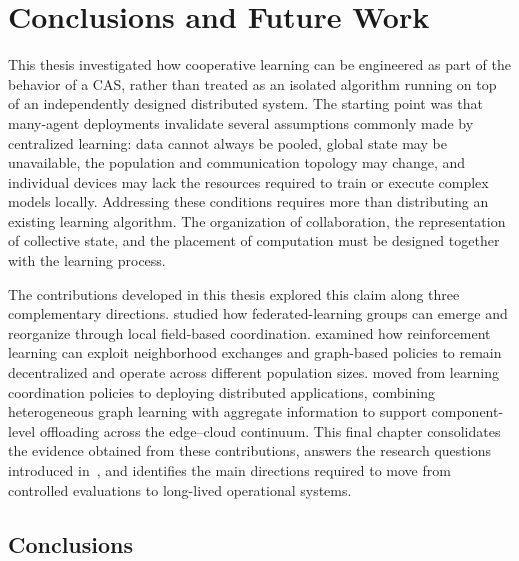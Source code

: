 
\chapter{Conclusions and Future Work}
\label{chap:wrapup}
\minitoc

This thesis investigated how cooperative learning 
 can be engineered as part of the behavior of a \gls{CAS}, 
 rather than treated as an isolated algorithm running
 on top of an independently designed distributed system.
%
The starting point was that many-agent deployments invalidate several assumptions 
 commonly made by centralized learning: data cannot always be pooled,
 global state may be unavailable, the population and communication topology may change, 
 and individual devices may lack the resources required to train or execute complex models locally.
%
Addressing these conditions requires more than distributing an existing learning algorithm. 
%
The organization of collaboration, the representation of collective state, 
 and the placement of computation must be designed together with the learning process.

The contributions developed in this thesis explored 
 this claim along three complementary directions.
%
 studied how federated-learning groups can emerge 
 and reorganize through local field-based coordination.
%
 examined how reinforcement learning can exploit neighborhood exchanges
 and graph-based policies to remain decentralized and operate across different population sizes.
%
 moved from learning coordination policies to deploying distributed applications, 
 combining heterogeneous graph learning with aggregate information to support component-level offloading 
 across the edge--cloud continuum.
%
This final chapter consolidates the evidence obtained from these contributions,
 answers the research questions introduced in~, 
 and identifies the main directions required to move from controlled evaluations 
 to long-lived operational systems.


\section{Conclusions}
\label{sec:conclusions}

